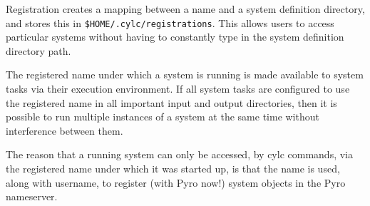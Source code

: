 
Registration creates a mapping between a name and a system definition
directory, and stores this in \lstinline=$HOME/.cylc/registrations=.
This allows users to access particular systems without having to
constantly type in the system definition directory path. 

The registered name under which a system is running is made available to
system tasks via their execution environment. If all system tasks are
configured to use the registered name in all important input and output
directories, then it is possible to run multiple instances of a system
at the same time without interference between them.

The reason that a running system can only be accessed, by cylc commands,
via the registered name under which it was started up, is that the name
is used, along with username, to register (with Pyro now!) system
objects in the Pyro nameserver.


